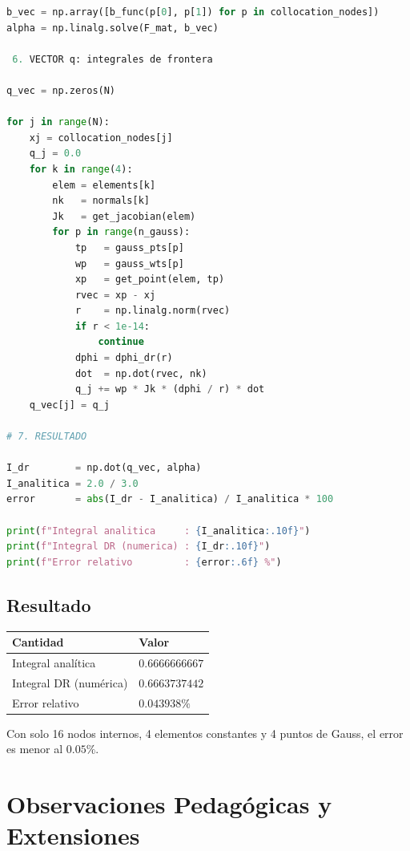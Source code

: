 \documentclass[12pt,a4paper]{article}
\begin{document}
\begin{lstlisting}[language=Python]
b_vec = np.array([b_func(p[0], p[1]) for p in collocation_nodes])
alpha = np.linalg.solve(F_mat, b_vec)

 6. VECTOR q: integrales de frontera

q_vec = np.zeros(N)

for j in range(N):
    xj = collocation_nodes[j]
    q_j = 0.0
    for k in range(4):
        elem = elements[k]
        nk   = normals[k]
        Jk   = get_jacobian(elem)
        for p in range(n_gauss):
            tp   = gauss_pts[p]
            wp   = gauss_wts[p]
            xp   = get_point(elem, tp)
            rvec = xp - xj
            r    = np.linalg.norm(rvec)
            if r < 1e-14:
                continue
            dphi = dphi_dr(r)
            dot  = np.dot(rvec, nk)
            q_j += wp * Jk * (dphi / r) * dot
    q_vec[j] = q_j

# 7. RESULTADO

I_dr        = np.dot(q_vec, alpha)
I_analitica = 2.0 / 3.0
error       = abs(I_dr - I_analitica) / I_analitica * 100

print(f"Integral analitica     : {I_analitica:.10f}")
print(f"Integral DR (numerica) : {I_dr:.10f}")
print(f"Error relativo         : {error:.6f} %")
\end{lstlisting}

\subsection{Resultado}

\begin{center}
\begin{tabular}{ll}
\toprule
Cantidad & Valor \\
\midrule
Integral analítica      & $0.6666666667$ \\
Integral DR (numérica)  & $0.6663737442$ \\
Error relativo          & $0.043938\%$   \\
\bottomrule
\end{tabular}
\end{center}

Con solo 16 nodos internos, 4 elementos constantes y 4 puntos de Gauss,
el error es menor al $0.05\%$.

\section{Observaciones Pedagógicas y Extensiones}
\end{document}
